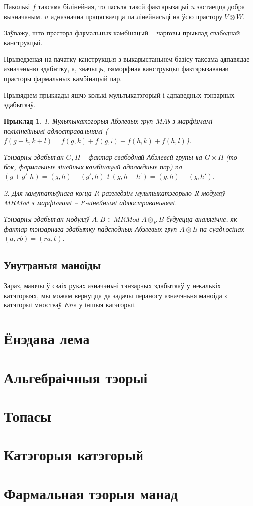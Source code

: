 \documentclass[a4paper,12pt]{book}
\newtheorem{example}{Прыклад}[section]
\begin{document}
Паколькі $f$ таксама білінейная, то пасьля такой фактарызацыі $u$
застаецца добра вызначаным. $u$ адназначна працягваецца па лінейнасьці
на ўсю прастору $V \otimes W$.

Заўважу, што прастора фармальных камбінацый -- чарговы прыклад
свабоднай канструкцыі.

Прыведзеная на пачатку канструкцыя з выкарыстаньнем базісу таксама
адпавядае азначэньню здабытку, а, значыць, ізаморфная канструкцыі
фактарызаванай прасторы фармальных камбінацый пар.

Прывядзем прыклады яшчэ колькі мультыкатэгорый і адпаведных тэнзарных
здабыткаў.

\begin{example}
  1. Мультыкатэгорыя Абэлевых груп $MAb$ з марфізмамі -- полілінейнымі
  адлюстраваньнямі ($f(g + h, k + l) = f(g, k) + f(g, l) + f(h, k) +
  f(h, l)$).

  Тэнзарны здабытак $G, H$ -- фактар свабоднай Абэлевай групы на $G
  \times H$ (то бок, фармальных лінейных камбінацый адпаведных пар) па
  $(g + g', h) = (g, h) + (g', h)$ і $(g, h + h') = (g, h) + (g, h')$.

  2. Для камутатыўнага колца $R$ разгледзім мультыкатэгорыю
  $R$-модуляў $MRMod$ з марфізмамі -- $R$-лінейнымі адлюстраваньнямі.

  Тэнзарны здабытак модуляў $A, B \in MRMod$ $A \otimes_R B$ будуецца
  аналягічна, як фактар тэнзарнага здабытку падсподных Абэлевых груп
  $A \otimes B$ па суадносінах $(a, rb) = (ra, b)$.
\end{example}

\section{Унутраныя маноіды}

Зараз, маючы ў сваіх руках азначэньні тэнзарных здабыткаў у некалькіх
катэгорыях, мы можам вернуцца да задачы пераносу азначэньня маноіда з
катэгорыі мностваў $Ens$ у іншыя катэгорыі.

\chapter{Ёнэдава лема}

\chapter{Альгебраічныя тэорыі}

\chapter{Топасы}

\chapter{Катэгорыя катэгорый}

\chapter{Фармальная тэорыя манад}
\end{document}
